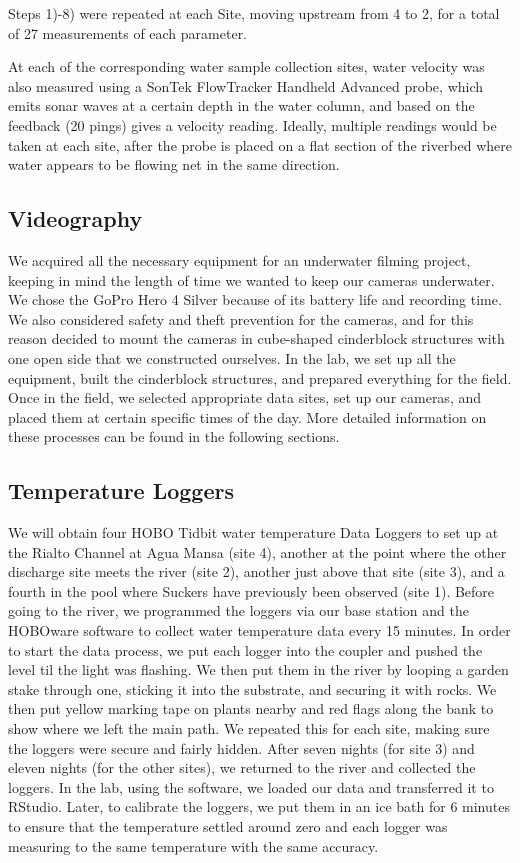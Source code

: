 \documentclass{article}\usepackage[]{graphicx}\usepackage[]{color}
\begin{document}
Steps 1)-8) were repeated at each Site, moving upstream from 4 to 2, for a total of 27 measurements of each parameter.



At each of the corresponding water sample collection sites, water velocity was also measured using a SonTek FlowTracker Handheld Advanced probe, which emits sonar waves at a certain depth in the water column, and based on the feedback (20 pings) gives a velocity reading. Ideally, multiple readings would be taken at each site, after the probe is placed on a flat section of the riverbed where water appears to be flowing net in the same direction. 

\subsection{Videography}

We acquired all the necessary equipment for an underwater filming project, keeping in mind the length of time we wanted to keep our cameras underwater. We chose the GoPro Hero 4 Silver because of its battery life and recording time. We also considered safety and theft prevention for the cameras, and for this reason decided to mount the cameras in cube-shaped cinderblock structures with one open side that we constructed ourselves. In the lab, we set up all the equipment, built the cinderblock structures, and prepared everything for the field. Once in the field, we selected appropriate data sites, set up our cameras, and placed them at certain specific times of the day. More detailed information on these processes can be found in the following sections.

\subsection{Temperature Loggers}
We will obtain four HOBO Tidbit water temperature Data Loggers to set up at the Rialto Channel at Agua Mansa (site 4), another at the point where the other discharge site meets the river (site 2), another just above that site (site 3), and a fourth in the pool where Suckers have previously been observed (site 1). Before going to the river, we programmed the loggers via our base station and the HOBOware software to collect water temperature data every 15 minutes. In order to start the data process, we put each logger into the coupler and pushed the level til the light was flashing. We then put them in the river by looping a garden stake through one, sticking it into the substrate, and securing it with rocks. We then put yellow marking tape on plants nearby and red flags along the bank to show where we left the main path. We repeated this for each site, making sure the loggers were secure and fairly hidden. After seven nights (for site 3) and eleven nights (for the other sites), we returned to the river and collected the loggers. In the lab, using the software, we loaded our data and transferred it to RStudio. Later, to calibrate the loggers, we put them in an ice bath for 6 minutes to ensure that the temperature settled around zero and each logger was measuring to the same temperature with the same accuracy.
\end{document}
